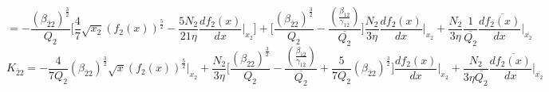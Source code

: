 \documentclass[fleqn, 10pt]{article}
\begin{document}
\begin{equation*}
    = - \frac{(\beta_{\overline{2}2})^\frac{3}{2}}{Q_{2}} \biggl[  \frac{4}{7}\sqrt{x_{2}} (f_{2}(x))^\frac{5}{2} - \frac{5N_{2}}{21 \eta} \frac{df_{2}(x)}{dx} \biggr|_{x_{2}}  \biggr] + \biggl[ \frac{(\beta_{\overline{2}2})^\frac{3}{2}}{Q_{2}} - \frac{\left( \frac{\beta_{12}}{\gamma_{1\overline{2}}}\right)}{\overline{Q_{2}}} \biggr] \frac{N_{2}}{3 \eta} \frac{df_{2}(x)}{dx} \biggr|_{x_{2}} + \frac{N_{2}}{3\eta} \frac{1}{\overline{Q_{2}}} \frac{d\overline{f_{2}(x)}}{dx} \biggr|_{\overline{x_{2}}}
\end{equation*}
\begin{equation}
  K_{\overline{2}2}  = -    \frac{4}{7 Q_{2}} (\beta_{\overline{2}2})^\frac{3}{2} \sqrt{x} (f_{2}(x))^\frac{5}{2} \Bigg|_{x_{2}} + \frac{N_{2}}{3 \eta} \biggl[ \frac{(\beta_{\overline{2}2})^\frac{3}{2}}{Q_{2}} - \frac{\left( \frac{\beta_{12}}{\gamma_{1\overline{2}}}\right)}{\overline{Q_{2}}} + \frac{5}{7Q_{2}} (\beta_{\overline{2}2})^\frac{3}{2} \biggr]   \frac{df_{2}(x)}{dx} \Bigg|_{x_{2}} + \frac{N_{2}}{3 \eta \overline{Q_{2}}}   \frac{d\overline{f_{2}(x)}}{dx} \Bigg|_{\overline{x_{2}}}
\end{equation}
\end{document}
